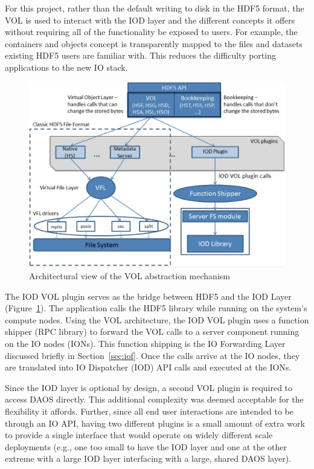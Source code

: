 \documentclass[conference]{IEEEtran} \pdfpagewidth=8.5in
\begin{document}
For this project, rather than the default writing to disk in the HDF5 format,
the VOL is used to interact with the IOD layer and the different concepts it
offers without requiring all of the functionality be exposed to users. For
example, the containers and objects concept is transparently mapped to the
files and datasets existing HDF5 users are familiar with.  This reduces the
difficulty porting applications to the new IO stack.

\begin{figure}[htbp]
\centering
\includegraphics[width=\columnwidth]{images/vol-arch.png}
\caption{Architectural view of the VOL abstraction mechanism}
\label{fig:vol-arch}
\end{figure}

The IOD VOL plugin serves as the bridge between HDF5 and the IOD Layer
(Figure~\ref{fig:vol-arch}). The application calls the HDF5 library while
running on the system's compute nodes. Using the VOL architecture, the IOD VOL
plugin uses a function shipper (RPC library) to forward the VOL calls to a
server component running on the IO nodes (IONs). This function shipping is the
IO Forwarding Layer discussed briefly in Section~\ref{sec:iof}. Once the calls
arrive at the IO nodes, they are translated into IO Dispatcher (IOD) API calls
and executed at the IONs.

Since the IOD layer is optional by design, a second VOL plugin is required to
access DAOS directly. This additional complexity was deemed acceptable for the
flexibility it affords. Further, since all end user interactions are intended
to be through an IO API, having two different plugins is a small amount of
extra work to provide a single interface that would operate on widely different
scale deployments (e.g., one too small to have the IOD layer and one at the
other extreme with a large IOD layer interfacing with a large, shared DAOS
layer).
\end{document}
